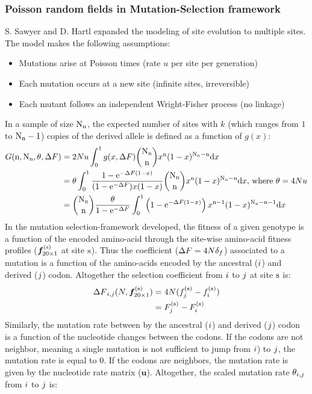\subsubsection{Poisson random fields in Mutation-Selection framework }
S. Sawyer and D. Hartl expanded the modeling of site evolution to multiple sites.
The model makes the following assumptions: 
\begin{itemize}
	\setlength\itemsep{-0.2em}
	\item Mutations arise at Poisson times (rate $u$ per site per generation)
	\item Each mutation occurs at a new site (infinite sites, irreversible)
	\item Each mutant follows an independent Wright-Fisher process (no linkage)
\end{itemize}
In a sample of size $\text{N}_{\text{n}}$, the expected number of sites with $k$ (which ranges from $1$ to $\text{N}_{\text{n}}-1$) copies of the derived allele is defined as a function of $g(x)$:
\begin{align}
G(\text{n}, \text{N}_{\text{n}}, \theta, {\Delta F}) & = 2 N u \int_{0}^{1} g(x, {\Delta F})  \binom{\text{N}_{\text{n}}}{\text{n}} x^{\text{n}} (1-x)^{\text{N}_{\text{n}}-\text{n}} \mathrm{d} x \nonumber \\
& = \theta \int_{0}^{1} \dfrac{1 - \mathrm{e}^{-{\Delta F} (1-x)}}{(1 - \mathrm{e}^{-{\Delta F}})x(1-x)} \binom{\text{N}_{\text{n}}}{\text{n}} x^{\text{n}} (1-x)^{\text{N}_{\text{n}}-\text{n}} \mathrm{d} x\text{, where } \theta=4N u \nonumber \\
& = \binom{\text{N}_{\text{n}}}{\text{n}} \dfrac{\theta }{1 - \mathrm{e}^{-{\Delta F}}} \int_{0}^{1} \left( 1 - \mathrm{e}^{-{\Delta F} (1-x)} \right) x^{\text{n}-1} (1-x)^{\text{N}_{\text{n}}-\text{n}-1} \mathrm{d} x
\end{align}
In the mutation selection-framework developed, the fitness of a given genotype is a function of the encoded amino-acid through the site-wise amino-acid fitness profiles ($ \bm{f}_{20\times1}^{(\text{s})} $ at site $\text{s}$). Thus the coefficient (${\Delta F}=4N {\delta_{f}} $) associated to a mutation is a function of the amino-acids encoded by the ancestral (${i}$) and derived (${j}$) codon. Altogether the selection coefficient from ${i}$ to ${j}$ at site $\text{s}$ is:
\begin{align}
{\Delta F}_{{i}, {j}}(N, \bm{f}_{20\times1}^{(\text{s})}) &= 4 N (f_{j}^{(\text{s})}-f_{i}^{(\text{s})}) \nonumber \\
& = F_{j}^{(\text{s})}-F_{i}^{(\text{s})}
\end{align}
Similarly, the mutation rate between by the ancestral (${i}$) and derived (${j}$) codon is a function of the nucleotide changes between the codons. If the codons are not neighbor, meaning a single mutation is not sufficient to jump from ${i}$) to ${j}$, the mutation rate is equal to $0$. If the codons are neighbors, the mutation rate is given by the nucleotide rate matrix ($ \bm{u} $). Altogether, the scaled mutation rate $\theta_{{i}, {j}}$ from ${i}$ to ${j}$ is:
